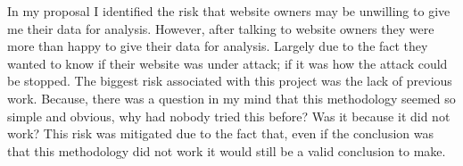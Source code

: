In my proposal I identified the risk that website owners may be unwilling to give me their data for analysis. However, after talking to website owners they were more than happy to give their data for analysis. Largely due to the fact they wanted to know if their website was under attack; if it was how the attack could be stopped. The biggest risk associated with this project was the lack of previous work. Because, there was a question in my mind that this methodology seemed so simple and obvious, why had nobody tried this before? Was it because it did not work? This risk was mitigated due to the fact that, even if the conclusion was that this methodology did not work it would still be a valid conclusion to make.